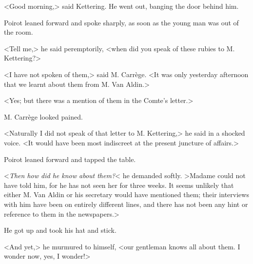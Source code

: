 <Good morning,> said Kettering. He went out, banging the door behind him.

Poirot leaned forward and spoke sharply, as soon as the young man was out of the room.

<Tell me,> he said peremptorily, <when did you speak of these rubies to M. Kettering?>

<I have not spoken of them,> said M. Carrège. <It was only yesterday afternoon that we learnt about them from M. Van Aldin.>

<Yes; but there was a mention of them in the Comte's letter.>

M. Carrège looked pained.

<Naturally I did not speak of that letter to M. Kettering,> he said in a shocked voice. <It would have been most indiscreet at the present juncture of affairs.>

Poirot leaned forward and tapped the table.

<\emph{Then how did he know about them?}< he demanded softly. >Madame could not have told him, for he has not seen her for three weeks. It seems unlikely that either M. Van Aldin or his secretary would have mentioned them; their interviews with him have been on entirely different lines, and there has not been any hint or reference to them in the newspapers.>

He got up and took his hat and stick.

<And yet,> he murmured to himself, <our gentleman knows all about them. I wonder now, yes, I wonder!>